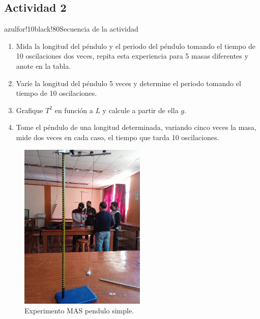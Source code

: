 \subsection{Actividad 2}
\begin{dyNoteImportant}[morado01!20]{azulfor!10}{black!80}{Secuencia de la actividad}
	\begin{enumerate}[label=\itemcirccz{miverde}{\arabic*},itemsep=2pt, leftmargin=0.6cm]
		\item Mida la longitud del péndulo y el periodo del péndulo tomando el tiempo de 10 oscilaciones dos veces, repita esta experiencia para 5 masas diferentes y anote en la tabla.
		\item Varíe la longitud del péndulo 5 veces y determine el periodo tomando el tiempo de 10 oscilaciones.
		\item Grafique $T^2$ en función a $L$ y calcule a partir de ella $g$.
		\item Tome el péndulo de una longitud determinada, variando cinco veces la masa, mide dos veces en cada caso, el tiempo que tarda 10 oscilaciones.
	\end{enumerate}
\end{dyNoteImportant}

\begin{figure}[H]
	\centering
	\includegraphics[width=6cm]{Images/pendulum.jpeg}
	\caption{Experimento MAS pendulo simple.}\label{fig:05}
\end{figure}

